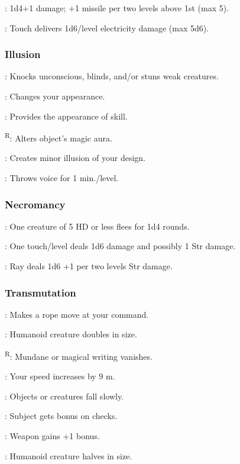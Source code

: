	: 1d4+1 damage; +1 missile per two levels above 1st (max 5).

	: Touch delivers 1d6/level electricity damage (max 5d6).

\subsubsection{Illusion}
	: Knocks unconscious, blinds, and/or stuns weak creatures.

	: Changes your appearance.

	: Provides the appearance of skill. %

	\textsuperscript{R}: Alters object's magic aura.

	: Creates minor illusion of your design.

	: Throws voice for 1 min./level.

\subsubsection{Necromancy}
	: One creature of 5 HD or less flees for 1d4 rounds.

	: One touch/level deals 1d6 damage and possibly 1 Str damage.

	: Ray deals 1d6 +1 per two levels Str damage.

\subsubsection{Transmutation}
	: Makes a rope move at your command.

	: Humanoid creature doubles in size.

	\textsuperscript{R}: Mundane or magical writing vanishes.

	: Your speed increases by 9 m.

	: Objects or creatures fall slowly.

	: Subject gets bonus on  checks.

	: Weapon gains +1 bonus.

	: Humanoid creature halves in size.



